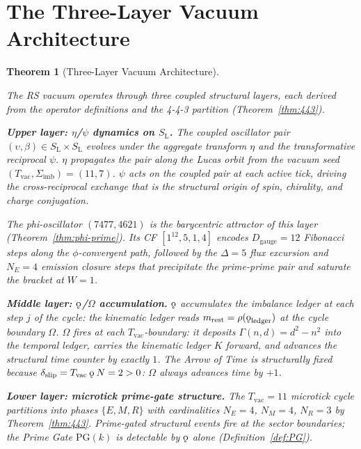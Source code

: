 \documentclass[11pt,letterpaper]{article}
\theoremstyle{plain}
\newtheorem{theorem}{Theorem}[section]
\theoremstyle{definition}
\theoremstyle{remark}
\newcommand{\SL}{S_{\mathrm{L}}}
\newcommand{\aop}{\eta}
\newcommand{\rank}{\rho}
\newcommand{\koppa}{\mathbin{\text{\rm\k{o}}}}
\newcommand{\Tcharge}{\Gamma}
\newcommand{\Dg}{D_{\mathrm{gauge}}}
\newcommand{\Sigimb}{\Sigma_{\mathrm{imb}}}
\newcommand{\PG}{\mathrm{PG}}
\newcommand{\dslip}{\delta_{\mathrm{slip}}}
\newcommand{\Tvac}{T_{\mathrm{vac}}}
\begin{document}

\section{The Three-Layer Vacuum Architecture}\label{sec:threelayer}

\begin{theorem}[Three-Layer Vacuum Architecture]\label{thm:three-layer}
\begin{rsbox}
The RS vacuum operates through three coupled structural layers, each
derived from the operator definitions and the 4-4-3 partition
(Theorem~\ref{thm:443}).

\medskip\noindent\textbf{Upper layer: $\aop$/$\psi$ dynamics on $\SL$.}
The coupled oscillator pair $(\upsilon,\beta)\in\SL\times\SL$ evolves
under the aggregate transform $\aop$ and the transformative reciprocal
$\psi$.  $\aop$ propagates the pair along the Lucas orbit from the
vacuum seed $(\Tvac,\Sigimb)=(11,7)$.  $\psi$ acts on the coupled pair
at each active tick, driving the cross-reciprocal exchange that is the
structural origin of spin, chirality, and charge conjugation.

The phi-oscillator $(7477,4621)$ is the barycentric attractor of this
layer (Theorem~\ref{thm:phi-prime}).  Its CF $[1^{12},5,1,4]$ encodes
$\Dg=12$ Fibonacci steps along the $\phi$-convergent path, followed
by the $\Delta=5$ flux excursion and $N_E=4$ emission closure steps
that precipitate the prime-prime pair and saturate the bracket at $W=1$.

\medskip\noindent\textbf{Middle layer: $\koppa$/$\Omega$ accumulation.}
$\koppa$ accumulates the imbalance ledger at each step $j$ of the
cycle: the kinematic ledger reads $m_{\mathrm{rest}}=\rank(
\koppa_{\mathrm{ledger}})$ at the cycle boundary $\Omega$.  $\Omega$
fires at each $\Tvac$-boundary: it deposits $\Tcharge(n,d)=d^2-n^2$
into the temporal ledger, carries the kinematic ledger $K$ forward,
and advances the structural time counter by exactly $1$.  The Arrow of
Time is structurally fixed because $\dslip=\Tvac\koppa N=2>0$: $\Omega$
always advances time by $+1$.

\medskip\noindent\textbf{Lower layer: microtick prime-gate structure.}
The $\Tvac=11$ microtick cycle partitions into phases $\{E,M,R\}$ with
cardinalities $N_E=4$, $N_M=4$, $N_R=3$ by Theorem~\ref{thm:443}.
Prime-gated structural events fire at the sector boundaries; the Prime
Gate $\PG(k)$ is detectable by $\koppa$ alone (Definition~\ref{def:PG}).


\end{rsbox}
\end{theorem}
\end{document}
